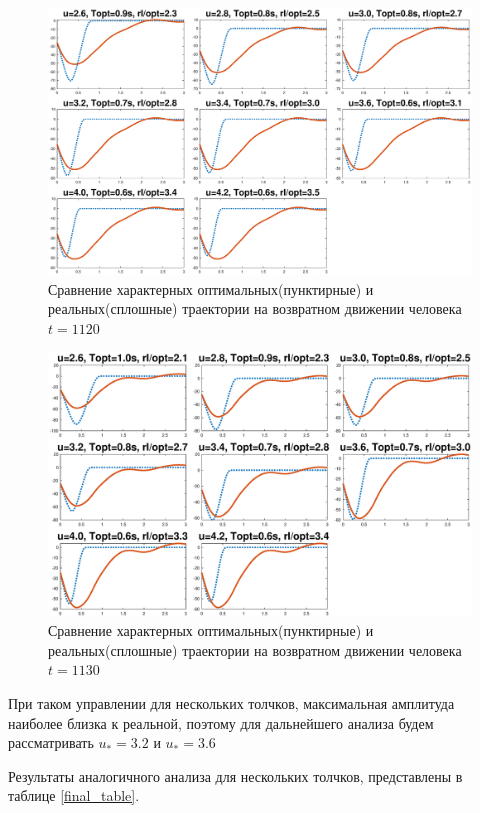 \documentclass[a4paper,12pt, openany]{book}
\theoremstyle{plain} %
\theoremstyle{definition} %
\theoremstyle{remark} %
\numberwithin{equation}{chapter}
\begin{document}
{\begin{figure}[h!]
    \centering
    \includegraphics[width=1\linewidth]{final_graphs.eps}
    \caption{Сравнение характерных оптимальных(пунктирные) и реальных(сплошные) траектории на возвратном движении человека $t=1120$}
    \label{final_graphs}
\end{figure}

\begin{figure}[h!]
    \centering
    \includegraphics[width=1\linewidth]{final_graphs_1.eps}
    \caption{Сравнение характерных оптимальных(пунктирные) и реальных(сплошные) траектории на возвратном движении человека $t=1130$}
    \label{final_graphs_1}
\end{figure}

При таком управлении для нескольких толчков, максимальная амплитуда наиболее близка к реальной, поэтому для дальнейшего анализа будем рассматривать $u_*=3.2$ и $u_*=3.6$


Результаты аналогичного анализа для нескольких толчков,
представлены в таблице \ref{final_table}.

}
\end{document}
